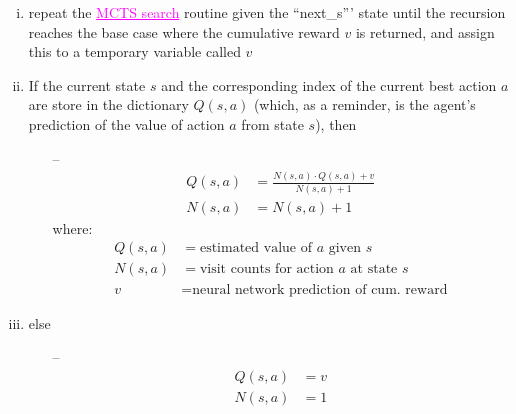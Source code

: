 \documentclass[12pt]{article}
\begin{document}
\begin{redenum}
\begin{enumerate}[A.)]
\begin{enumerate}[I.)]
\begin{enumerate}[i.)]
\begin{enumerate}[a.)]
\begin{goldenum}
\begin{enumerate}[a.)]
\begin{redenumnest}
\begin{enumerate}[a.)]
\begin{magentaenum}
\begin{enumerate}[a.)]
\begin{enumerate}[i.)]
											\item repeat the \textcolor{magenta}{\underline{MCTS search}} routine given the ``next\_s''' state until the recursion reaches the base case where the cumulative reward $v$ is returned, and assign this to a temporary variable called $v$
											\item If the current state $s$ and the corresponding index of the current best action $a$ are store in the dictionary $Q(s,a)$ (which, as a reminder, is the agent's prediction of the value of action $a$ from state $s$), then
											\begin{itemize}
												\item[--] 
												\begin{align*}
													Q(s,a) &= \frac{N(s,a) \cdot Q(s,a) + v}{N(s,a) + 1} \\
													N(s,a) &= N(s,a) + 1
												\end{align*}
												where:
												\begin{align*}
													Q(s,a) &= \text{estimated value of $a$ given $s$} \\
													N(s,a) &= \text{visit counts for action $a$ at state $s$} \\
													v &= \text{neural network prediction of cum. reward}
												\end{align*}
											\end{itemize}
											\item else
											\begin{itemize}
												\item[--] 
												\begin{align*}
													Q(s,a) &= v \\
													N(s,a) &= 1
												\end{align*}

\end{itemize}
\end{enumerate}
\end{enumerate}
\end{magentaenum}
\end{enumerate}
\end{redenumnest}
\end{enumerate}
\end{goldenum}
\end{enumerate}
\end{enumerate}
\end{enumerate}
\end{enumerate}
\end{redenum}
\end{document}
